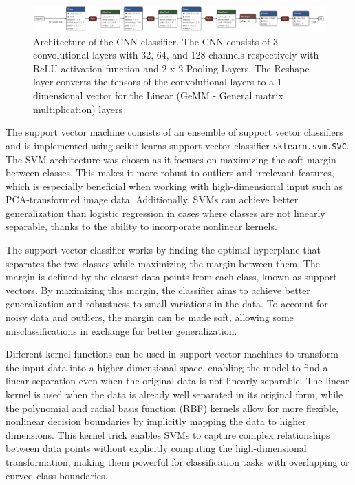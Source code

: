\documentclass[a4, 10 pt, conference]{ieeeconf}  %
\begin{document}
\begin{figure}[htbp]
    \centering
    \includegraphics[width=\textwidth]{../images/sign_lang_model.onnx.png}
    \caption{Architecture of the CNN classifier. The CNN consists of 3 convolutional layers with 32, 64, and 128 channels respectively with ReLU activation function and 2 x 2 Pooling Layers. The Reshape layer converts the tensors of the convolutional layers to a 1 dimensional vector for the Linear (GeMM - General matrix multiplication) layers}
    \label{fig:cnn}
\end{figure}

The support vector machine consists of an ensemble of support vector classifiers and is implemented using scikit-learns support vector classifier \texttt{sklearn.svm.SVC}. 
The SVM architecture was chosen as it focuses on maximizing the soft margin between classes. This makes it more robust to outliers and irrelevant features, which is especially beneficial when working with high-dimensional input such as PCA-transformed image data. Additionally, SVMs can achieve better generalization than logistic regression in cases where classes are not linearly separable, thanks to the ability to incorporate nonlinear kernels.

The support vector classifier works by finding the optimal hyperplane that separates the two classes while maximizing the margin between them. The margin is defined by the closest data points from each class, known as support vectors. By maximizing this margin, the classifier aims to achieve better generalization and robustness to small variations in the data. To account for noisy data and outliers, the margin can be made soft, allowing some misclassifications in exchange for better generalization.

Different kernel functions can be used in support vector machines to transform the input data into a higher-dimensional space, enabling the model to find a linear separation even when the original data is not linearly separable. The linear kernel is used when the data is already well separated in its original form, while the polynomial and radial basis function (RBF) kernels allow for more flexible, nonlinear decision boundaries by implicitly mapping the data to higher dimensions. This kernel trick enables SVMs to capture complex relationships between data points without explicitly computing the high-dimensional transformation, making them powerful for classification tasks with overlapping or curved class boundaries.
\end{document}
